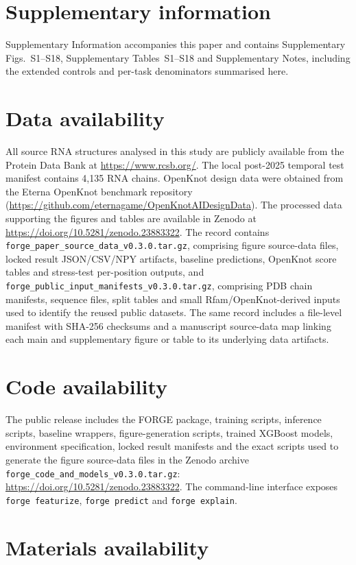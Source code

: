 \section*{Supplementary information}
Supplementary Information accompanies this paper and contains Supplementary
Figs.~S1--S18, Supplementary Tables~S1--S18 and Supplementary Notes, including
the extended controls and per-task denominators summarised here.

\section*{Data availability}

All source RNA structures analysed in this study are publicly available from the
Protein Data Bank at \url{https://www.rcsb.org/}. The local post-2025 temporal
test manifest contains 4,135 RNA chains. OpenKnot design data were obtained from
the Eterna OpenKnot benchmark repository
(\url{https://github.com/eternagame/OpenKnotAIDesignData}). The processed data
supporting the figures and tables are available in Zenodo at
\url{https://doi.org/10.5281/zenodo.23883322}. The record contains
\texttt{forge\_paper\_source\_data\_v0.3.0.tar.gz}, comprising figure
source-data files, locked result JSON/CSV/NPY artifacts, baseline predictions,
OpenKnot score tables and stress-test per-position outputs, and
\texttt{forge\_public\_input\_manifests\_v0.3.0.tar.gz}, comprising PDB chain
manifests, sequence files, split tables and small Rfam/OpenKnot-derived inputs
used to identify the reused public datasets. The same record includes a
file-level manifest with SHA-256 checksums and a manuscript source-data map
linking each main and supplementary figure or table to its underlying data
artifacts.

\section*{Code availability}

The public release includes the FORGE package, training scripts, inference
scripts, baseline wrappers, figure-generation scripts, trained XGBoost models,
environment specification, locked result manifests and the exact scripts used to
generate the figure source-data files in the Zenodo archive
\texttt{forge\_code\_and\_models\_v0.3.0.tar.gz}:
\url{https://doi.org/10.5281/zenodo.23883322}. The
command-line interface exposes \texttt{forge featurize},
\texttt{forge predict} and \texttt{forge explain}.

\section*{Materials availability}

